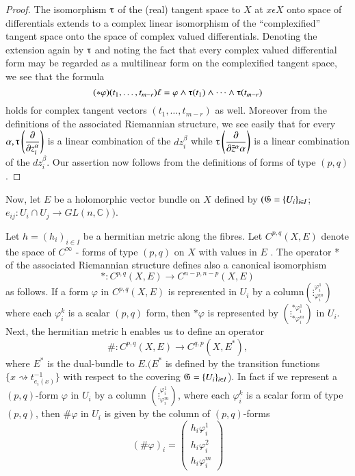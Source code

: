 \begin{proof}  
  The isomorphism $\tauup$ of the (real) tangent space to
  $X$ at $x \epsilon X$ onto space of 
  differentials extends to a complex linear isomorphism of the
  ``complexified'' tangent space onto the space of complex  
  valued differentials.  Denoting the extension again by $\tauup$ and
  noting the fact that every complex valued differential 
  form may be regarded as a multilinear form on the complexified
  tangent space, we see that the formula  
  $$
  (*\varphi)(t_1,\dots,t_{m-r})\ell = \varphi\wedge \tauup(t_1)\wedge
  \dots \wedge \tauup(t_{m-r})
  $$
  holds for complex tangent vectors $(t_1,\dots,t_{m-r})$ as well.
  Moreover from the definitions of the associated 
  Riemannian structure, we see easily that for every
  $\alpha,\tauup\left(\dfrac{\partial}{\partial z^\alpha_i} \right)$ is a 
  linear combination of the $dz_i^\beta$ while
  $\tauup \left(\dfrac{\partial}{\partial
    \bar{z}^\alpha\alpha}\right)$ is a linear   
  combination of the $dz_i^\beta$.  Our assertion now follows from
  the definitions of forms of type $(p,q)$. 
\end{proof}

Now, let $E$ be a holomorphic vector bundle on $X$ defined by 
$(\mathfrak{G} = \{U_i\}_{i \in I}$; $e_{ij}:U_i \cap U_j
\rightarrow GL (n,\mathbb{C}))$.  

Let $h = (h _i)_{i \in I}$ be a hermitian metric along the fibres.
Let $C ^{p,q} (X,E)$ denote the  
space of $C^{\infty}$ - forms of type $(p,q)$ on $X$ with values in $E$ .
The operator * of the associated Riemannian 
structure defines also a canonical isomorphism 
$$
* : C^{p,q} (X,E) \rightarrow C^{n-p, n-p}(X,E)
$$ 
as follows.  If a form $\varphi$ in $C^{p,q}(X,E)$ is represented
in $U_i$ by a  
column\pageoriginale $\left (\vdots^{\varphi^1_i}_{\varphi^m_i}\right)$
where each $\varphi^k_i$ is a scalar $(p,q)$ form, then $* \varphi$ is
represented by $\left (\vdots^{ *\varphi^1_i}_{* \varphi^m_i}\right)$ 
in $U_i$.  Next, the hermitian metric h enables us to define an
operator 
$$ 
\# :  C^{p,q}(X,E)\rightarrow C^{q,p}(X,E^*),
$$ 
where $E^*$ is the dual-bundle to $E.(E^*$ is defined by the
transition functions $\{ x \rightsquigarrow t_{e_i (x)}^{-1}\}$ with
respect to the covering  
$\mathfrak{G} = \{ U_i\}_{i \in I}$).  In fact if we represent a
$(p,q)$-form $\varphi$ in $U_i$ by a column $\left
(\vdots^{\varphi^1_i}_{\varphi^m_i}\right)$, where each $\varphi^k_i$
is a scalar form of type $(p,q)$, then $\# \varphi$ in $ U_i$ 
is given by the column of $(p,q)$-forms 
$$ 
(\#  \varphi)_i  =
\begin{pmatrix} 
  h_i \varphi^1_i\\ 
  h_i \varphi^2_i\\ 
  h_i \varphi^m_i  
\end{pmatrix}
$$ 

